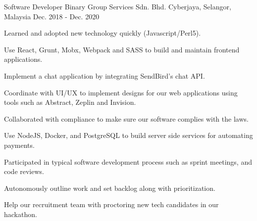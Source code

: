 \begin{cventries}
  \cventry
    {Software Developer} %
    {Binary Group Services Sdn. Bhd.} %
    {Cyberjaya, Selangor, Malaysia} %
    {Dec. 2018 - Dec. 2020} %
    {
      \begin{cvitems} %
        \item {Learned and adopted new technology quickly (Javascript/Perl5).}
        \item {Use React, Grunt, Mobx, Webpack and SASS to build and maintain frontend applications.}
        \item {Implement a chat application by integrating SendBird's chat API.}
        \item {Coordinate with UI/UX to implement designs for our web applications using tools such as Abstract, Zeplin and Invision.}
        \item {Collaborated with compliance to make sure our software complies with the laws.}
        \item {Use NodeJS, Docker, and PostgreSQL to build server side services for automating payments.}
        \item {Participated in typical software development process such as sprint meetings, and code reviews.}
        \item {Autonomously outline work and set backlog along with prioritization.}
        \item {Help our recruitment team with proctoring new tech candidates in our hackathon.}
      \end{cvitems}
    }

\end{cventries}
